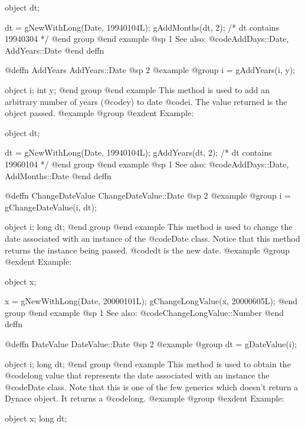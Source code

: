 object  dt;

dt = gNewWithLong(Date, 19940104L);
gAddMonths(dt, 2);   /*  dt contains 19940304  */
@end group
@end example
@sp 1
See also:  @code{AddDays::Date, AddYears::Date}
@end deffn











@deffn {AddYears} AddYears::Date
@sp 2
@example
@group
i = gAddYears(i, y);

object  i;
int     y;
@end group
@end example
This method is used to add an arbitrary number of years (@code{y}) to
date @code{i}.  The value returned is the object passed.
@example
@group
@exdent Example:

object  dt;

dt = gNewWithLong(Date, 19940104L);
gAddYears(dt, 2);   /*  dt contains 19960104  */
@end group
@end example
@sp 1
See also:  @code{AddDays::Date, AddMonths::Date}
@end deffn










@deffn {ChangeDateValue} ChangeDateValue::Date
@sp 2
@example
@group
i = gChangeDateValue(i, dt);

object  i;
long    dt;
@end group
@end example
This method is used to change the date associated with an instance of
the @code{Date} class.  Notice that this method returns the instance
being passed.  @code{dt} is the new date.
@example
@group
@exdent Example:

object  x;

x = gNewWithLong(Date, 20000101L);
gChangeLongValue(x, 20000605L);
@end group
@end example
@sp 1
See also:  @code{ChangeLongValue::Number}
@end deffn







@deffn {DateValue} DateValue::Date
@sp 2
@example
@group
dt = gDateValue(i);

object  i;
long    dt;
@end group
@end example
This method is used to obtain the @code{long} value that represents
the date associated with an instance the @code{Date} class.  Note that
this is one of the few generics which doesn't return a Dynace object.
It returns a @code{long}.
@example
@group
@exdent Example:

object  x;
long    dt;

